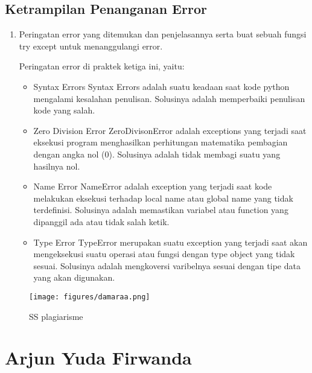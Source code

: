 \subsection{Ketrampilan Penanganan Error}
\begin{enumerate}
	\item Peringatan error yang ditemukan dan penjelasannya serta buat sebuah fungsi try except untuk menanggulangi error.
	
	Peringatan error di praktek ketiga ini, yaitu:
	\begin{itemize}
		\item Syntax Errors
		Syntax Errors adalah suatu keadaan saat kode python mengalami kesalahan penulisan. Solusinya adalah memperbaiki penulisan kode yang salah.
		
		\item Zero Division Error
		ZeroDivisonError adalah exceptions yang terjadi saat eksekusi program menghasilkan perhitungan matematika pembagian dengan angka nol (0). Solusinya adalah tidak membagi suatu yang hasilnya nol.
		
		\item Name Error
		NameError adalah exception yang terjadi saat kode melakukan eksekusi terhadap local name atau global name yang tidak terdefinisi. Solusinya adalah memastikan variabel atau function yang dipanggil ada atau tidak salah ketik.
		
		\item Type Error
		TypeError merupakan suatu exception yang terjadi saat akan mengeksekusi suatu operasi atau fungsi dengan type object yang tidak sesuai. Solusinya adalah mengkoversi varibelnya sesuai dengan tipe data yang akan digunakan.
	\end{itemize}
   \end{enumerate}

   \begin{figure}
   \centering
   \texttt{[image: figures/damaraa.png]}
   \caption{SS plagiarisme}
   \label{damara}
   \end{figure}

\section{Arjun Yuda Firwanda}
